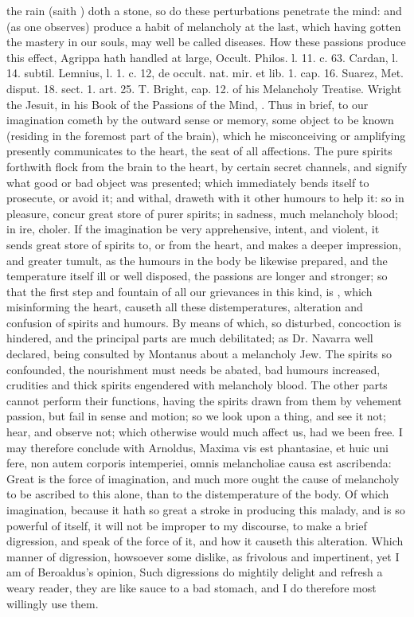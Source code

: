 {the rain (saith \Austin{}) doth a stone, so do these perturbations
penetrate the mind: and (as one observes) produce a habit of
melancholy at the last, which having gotten the mastery in our souls,
may well be called diseases.
How these passions produce this effect, Agrippa hath handled at
large, Occult. Philos. l. 11. c. 63. Cardan, l. 14. subtil. Lemnius, l.
1. c. 12, de occult. nat. mir. et lib. 1. cap. 16. Suarez, Met. disput.
18. sect. 1. art. 25. T. Bright, cap. 12. of his Melancholy Treatise.
Wright the Jesuit, in his Book of the Passions of the Mind, \etc{}. Thus in
brief, to our imagination cometh by the outward sense or memory, some
object to be known (residing in the foremost part of the brain), which
he misconceiving or amplifying presently communicates to the heart, the
seat of all affections. The pure spirits forthwith flock from the brain
to the heart, by certain secret channels, and signify what good or bad
object was presented; which immediately bends itself to
prosecute, or avoid it; and withal, draweth with it other humours to
help it: so in pleasure, concur great store of purer spirits; in
sadness, much melancholy blood; in ire, choler. If the imagination be
very apprehensive, intent, and violent, it sends great store of spirits
to, or from the heart, and makes a deeper impression, and greater
tumult, as the humours in the body be likewise prepared, and the
temperature itself ill or well disposed, the passions are longer and
stronger; so that the first step and fountain of all our grievances in
this kind, is , which misinforming the heart,
causeth all these distemperatures, alteration and confusion of spirits
and humours. By means of which, so disturbed, concoction is hindered,
and the principal parts are much debilitated; as Dr. Navarra well
declared, being consulted by Montanus about a melancholy Jew. The
spirits so confounded, the nourishment must needs be abated, bad
humours increased, crudities and thick spirits engendered with
melancholy blood. The other parts cannot perform their functions,
having the spirits drawn from them by vehement passion, but fail in
sense and motion; so we look upon a thing, and see it not; hear, and
observe not; which otherwise would much affect us, had we been free. I
may therefore conclude with Arnoldus, Maxima vis est phantasiae,
et huic uni fere, non autem corporis intemperiei, omnis melancholiae
causa est ascribenda: Great is the force of imagination, and much more
ought the cause of melancholy to be ascribed to this alone, than to the
distemperature of the body. Of which imagination, because it hath so
great a stroke in producing this malady, and is so powerful of itself,
it will not be improper to my discourse, to make a brief digression,
and speak of the force of it, and how it causeth this alteration. Which
manner of digression, howsoever some dislike, as frivolous and
impertinent, yet I am of Beroaldus's opinion, Such digressions do
mightily delight and refresh a weary reader, they are like sauce to a
bad stomach, and I do therefore most willingly use them.

}
